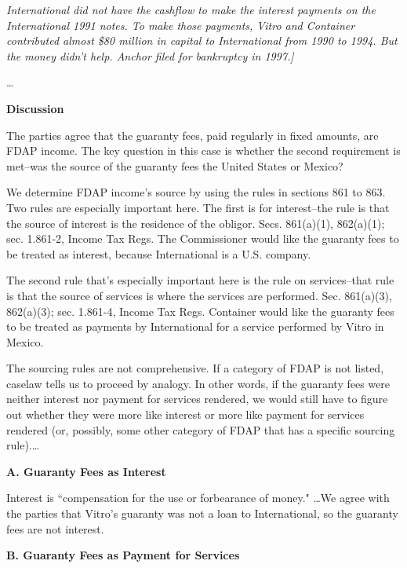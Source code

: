 \begin{select}
\textit{International did not have the cashflow to make the interest payments on the International 1991 notes. To make those payments, Vitro and Container contributed almost \$80 million in capital to International from 1990 to 1994. But the money didn't help.  Anchor filed for bankruptcy in 1997.]}

\ldots

\begin{center} \textbf{Discussion}
\end{center}

The parties agree that the guaranty fees, paid regularly in fixed amounts, are FDAP income. The key question in this case is whether the second requirement is met--was the source of the guaranty fees the United States or Mexico?

We determine FDAP income's source by using the rules in sections 861 to 863. Two rules are especially important here. The first is for interest--the rule is that the source of interest is the residence of the obligor. Secs. 861(a)(1), 862(a)(1); sec. 1.861-2, Income Tax Regs. The Commissioner would like the guaranty fees to be treated as interest, because International  is a U.S. company.

The second rule that's especially important here is the rule on services--that rule is that the source of services is where the services are performed. Sec. 861(a)(3), 862(a)(3); sec. 1.861-4, Income Tax Regs. Container would like the guaranty fees to be treated as payments by International for a service performed by Vitro in Mexico.

The sourcing rules are not comprehensive. If a category of FDAP is not listed, caselaw tells us to proceed by analogy. In other words, if the guaranty fees were neither interest nor payment for services rendered, we would still have to figure out whether they were more like interest or more like payment for services rendered (or, possibly, some other category of FDAP that has a specific sourcing rule).\ldots 

\begin{center}
	\textbf{A. Guaranty Fees as Interest}
\end{center}

Interest is ``compensation for the use or forbearance of money."  \ldots We agree with the parties that Vitro's guaranty was not a loan to International, so the guaranty fees are not interest.

\begin{center}
	\textbf{B. Guaranty Fees as Payment for Services}
		\end{center}


\end{select}
